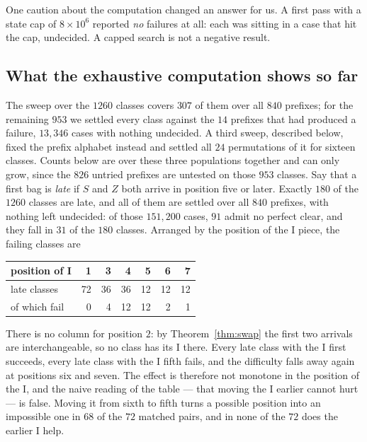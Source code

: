 \documentclass[11pt,a4paper]{article}
\theoremstyle{plain}
\theoremstyle{definition}
\theoremstyle{remark}
\begin{document}
One caution about the computation changed an answer for us. A first pass with a state
cap of $8 \times 10^6$ reported \emph{no} failures at all: each was sitting in a case
that hit the cap, undecided. A capped search is not a negative result.

\subsection*{What the exhaustive computation shows so far}

The sweep over the $1260$ classes covers $307$ of them over all $840$ prefixes; for the
remaining $953$ we settled every class against the $14$ prefixes that had produced a
failure, $13{,}346$ cases with nothing undecided. A third sweep, described below, fixed
the prefix alphabet instead and settled all $24$ permutations of it for sixteen classes.
Counts below are over these three populations together and can only grow, since the
$826$ untried prefixes are untested on those $953$ classes.
Say that a first bag is \emph{late} if $S$ and $Z$ both arrive in position five or
later. Exactly $180$ of the $1260$ classes are late, and all of them are settled over
all $840$ prefixes, with nothing left undecided: of those $151{,}200$ cases, $91$ admit
no perfect clear, and they fall in $31$ of the $180$ classes.
Arranged by the position of the I piece, the failing classes are

\begin{center}
\begin{tabular}{lrrrrrr}
\toprule
position of I & 1 & 3 & 4 & 5 & 6 & 7 \\
\midrule
late classes & 72 & 36 & 36 & 12 & 12 & 12 \\
of which fail & 0 & 4 & 12 & 12 & 2 & 1 \\
\bottomrule
\end{tabular}
\end{center}

There is no column for position $2$: by Theorem~\ref{thm:swap} the first two arrivals
are interchangeable, so no class has its I there. Every late class with the I first
succeeds, every late class with the I fifth fails, and the difficulty falls away again
at positions six and seven. The effect is therefore not monotone in the position of
the I, and the naive reading of the table --- that moving the I earlier cannot hurt ---
is false. Moving it from sixth to fifth turns a possible position into an impossible
one in $68$ of the $72$ matched pairs, and in none of the $72$ does the earlier I help.
\end{document}
